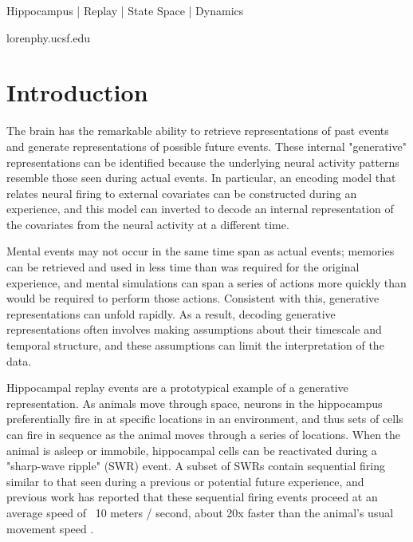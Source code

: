 \documentclass[times, twoside]{zHenriquesLab-StyleBioRxiv}
\begin{document}
\begin{keywords}
Hippocampus | Replay | State Space | Dynamics
\end{keywords}

\begin{corrauthor}
loren\at phy.ucsf.edu
\end{corrauthor}

\section*{Introduction}
The brain has the remarkable ability to retrieve representations of past events and generate representations of possible future events. These internal "generative" representations \cite{KayConstantSubsecondCycling2020} can be identified because the underlying neural activity patterns resemble those seen during actual events. In particular, an encoding model that relates neural firing to external covariates can be constructed during an experience, and this model can inverted to decode an internal representation of the covariates from the neural activity at a different time.

Mental events may not occur in the same time span as actual events; memories can be retrieved and used in less time than was required for the original experience, and mental simulations can span a series of actions more quickly than would be required to perform those actions. Consistent with this, generative representations can unfold rapidly. As a result, decoding generative representations often involves making assumptions about their timescale and temporal structure, and these assumptions can limit the interpretation of the data. 

Hippocampal replay events are a prototypical example of a generative representation. As animals move through space, neurons in the hippocampus preferentially fire in at specific locations in an environment, and thus sets of cells can fire in sequence as the animal moves through a series of locations. When the animal is asleep or immobile, hippocampal cells can be reactivated during a "sharp-wave ripple" (SWR) event. A subset of SWRs contain sequential firing similar to that seen during a previous or potential future experience, and previous work has reported that these sequential firing events proceed at an average speed of ~10 meters / second, about 20x faster than the animal's usual movement speed \cite{DavidsonHippocampalReplayExtended2009}. 
\end{document}
